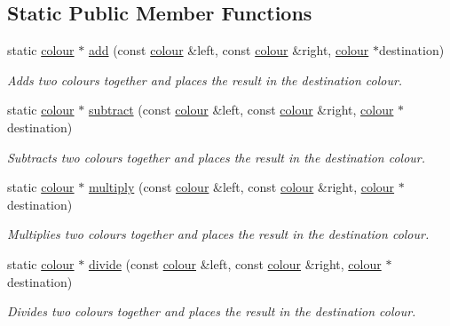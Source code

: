 \subsection*{Static Public Member Functions}
\begin{DoxyCompactItemize}
\item 
static \hyperlink{classflounder_1_1colour}{colour} $\ast$ \hyperlink{classflounder_1_1colour_a5d9f9d26b93a5414bdfc62b7526dca70}{add} (const \hyperlink{classflounder_1_1colour}{colour} \&left, const \hyperlink{classflounder_1_1colour}{colour} \&right, \hyperlink{classflounder_1_1colour}{colour} $\ast$destination)
\begin{DoxyCompactList}\small\item\em Adds two colours together and places the result in the destination colour. \end{DoxyCompactList}\item 
static \hyperlink{classflounder_1_1colour}{colour} $\ast$ \hyperlink{classflounder_1_1colour_a081a20a1be566ff1317d4214ef60f33d}{subtract} (const \hyperlink{classflounder_1_1colour}{colour} \&left, const \hyperlink{classflounder_1_1colour}{colour} \&right, \hyperlink{classflounder_1_1colour}{colour} $\ast$destination)
\begin{DoxyCompactList}\small\item\em Subtracts two colours together and places the result in the destination colour. \end{DoxyCompactList}\item 
static \hyperlink{classflounder_1_1colour}{colour} $\ast$ \hyperlink{classflounder_1_1colour_ada2598a03766be3adad831e17dcd822a}{multiply} (const \hyperlink{classflounder_1_1colour}{colour} \&left, const \hyperlink{classflounder_1_1colour}{colour} \&right, \hyperlink{classflounder_1_1colour}{colour} $\ast$destination)
\begin{DoxyCompactList}\small\item\em Multiplies two colours together and places the result in the destination colour. \end{DoxyCompactList}\item 
static \hyperlink{classflounder_1_1colour}{colour} $\ast$ \hyperlink{classflounder_1_1colour_afcbab734ed7ee0c3927ac0473150ed2a}{divide} (const \hyperlink{classflounder_1_1colour}{colour} \&left, const \hyperlink{classflounder_1_1colour}{colour} \&right, \hyperlink{classflounder_1_1colour}{colour} $\ast$destination)
\begin{DoxyCompactList}\small\item\em Divides two colours together and places the result in the destination colour. \end{DoxyCompactList}\item 

\end{DoxyCompactItemize}
